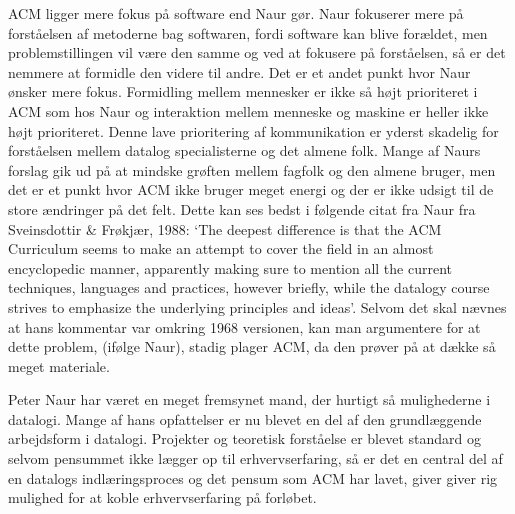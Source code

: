 ACM ligger mere fokus på software end Naur gør. Naur fokuserer mere på forståelsen af metoderne bag 
softwaren, fordi software kan blive forældet, men problemstillingen vil være den samme og ved at 
fokusere på forståelsen, så er det nemmere at formidle den videre til andre. Det er et andet punkt 
hvor Naur ønsker mere fokus. Formidling mellem mennesker er ikke så højt prioriteret i ACM som hos 
Naur og interaktion mellem menneske og maskine er heller ikke højt prioriteret. Denne lave prioritering 
af kommunikation er yderst skadelig for forståelsen mellem datalog specialisterne og det almene folk. 
Mange af Naurs forslag gik ud på at mindske grøften mellem fagfolk og den almene bruger, men det er et 
punkt hvor ACM ikke bruger meget energi og der er ikke udsigt til de store ændringer på det felt. 
Dette kan ses bedst i følgende citat fra Naur fra 
Sveinsdottir & Frøkjær, 1988: `The deepest difference is that the ACM 
Curriculum seems to make an attempt to cover the field in an almost 
encyclopedic manner, apparently making sure to mention all the current 
techniques, languages and practices, however briefly, while the 
datalogy course strives to emphasize the underlying principles and ideas'. 
Selvom det skal nævnes at hans kommentar var omkring 1968 versionen, 
kan man argumentere for at dette problem, (ifølge Naur), stadig plager 
ACM, da den prøver på at dække så meget materiale.

Peter Naur har været en meget fremsynet mand, der hurtigt så mulighederne i datalogi. Mange af hans 
opfattelser er nu blevet en del af den grundlæggende arbejdsform i datalogi. Projekter og teoretisk 
forståelse er blevet standard og selvom pensummet ikke lægger op til erhvervserfaring, så er det en 
central del af en datalogs indlæringsproces og det pensum som ACM har lavet, giver giver rig mulighed 
for at koble erhvervserfaring på forløbet.
